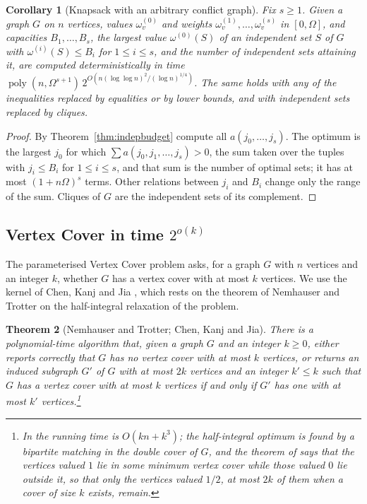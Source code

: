 \documentclass[11pt,reqno]{amsart}
\numberwithin{equation}{section}
\theoremstyle{plain}
\newtheorem{theorem}{Theorem}[section]
\newtheorem{corollary}[theorem]{Corollary}
\theoremstyle{definition}
\theoremstyle{remark}
\DeclareMathOperator{\poly}{poly}
\begin{document}
\begin{corollary}[Knapsack with an arbitrary conflict graph]\label{cor:knapsack}
Fix $s\ge1$. Given a graph $G$ on $n$ vertices, values $\omega^{(0)}_v$ and
weights $\omega^{(1)}_v,\dots,\omega^{(s)}_v$ in $[0,\Omega]$, and capacities
$B_1,\dots,B_s$, the largest value $\omega^{(0)}(S)$ of an independent set $S$
of $G$ with $\omega^{(i)}(S)\le B_i$ for $1\le i\le s$, and the number of
independent sets attaining it, are computed deterministically in time
$\poly(n,\Omega^{s+1})\,2^{O(n(\log\log n)^2/(\log n)^{1/4})}$. The same holds
with any of the inequalities replaced by equalities or by lower bounds, and
with independent sets replaced by cliques.
\end{corollary}

\begin{proof}
By Theorem~\ref{thm:indepbudget} compute all $a(j_0,\dots,j_s)$. The optimum is
the largest $j_0$ for which $\sum a(j_0,j_1,\dots,j_s)>0$, the sum taken over
the tuples with $j_i\le B_i$ for $1\le i\le s$, and that sum is the number of
optimal sets; it has at most $(1+n\Omega)^{s}$ terms. Other relations between
$j_i$ and $B_i$ change only the range of the sum. Cliques of $G$ are the
independent sets of its complement.
\end{proof}

\subsection{Vertex Cover in time $2^{o(k)}$}\label{ssec:vc}
The parameterised Vertex Cover problem asks, for a graph $G$ with $n$ vertices
and an integer $k$, whether $G$ has a vertex cover with at most $k$ vertices.
We use the kernel of Chen, Kanj and Jia \cite{CKJ01}, which rests on the theorem
of Nemhauser and Trotter \cite{NT75} on the half-integral relaxation of the
problem.

\begin{theorem}[Nemhauser and Trotter; Chen, Kanj and Jia]\label{thm:kernel}
There is a polynomial-time algorithm that, given a graph $G$ and an integer
$k\ge0$, either reports correctly that $G$ has no vertex cover with at most
$k$ vertices, or returns an induced subgraph $G'$ of $G$ with at most $2k$
vertices and an integer $k'\le k$ such that $G$ has a vertex cover with at most
$k$ vertices if and only if $G'$ has one with at most $k'$ vertices.\footnote{In
\cite{CKJ01} the running time is $O(kn+k^3)$; the half-integral optimum is
found by a bipartite matching in the double cover of $G$, and the theorem of
\cite{NT75} says that the vertices valued $1$ lie in some minimum vertex cover
while those valued $0$ lie outside it, so that only the vertices valued $1/2$,
at most $2k$ of them when a cover of size $k$ exists, remain.}
\end{theorem}
\end{document}
